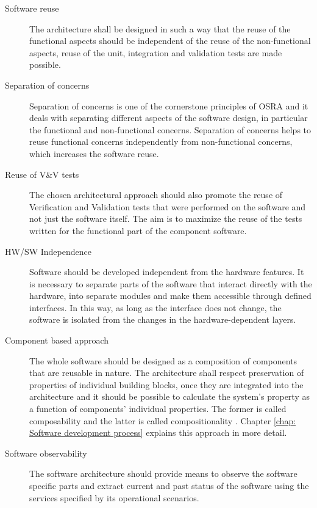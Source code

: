 \begin{description}
\item [Software reuse] The architecture shall be designed in such a way that the reuse of the functional aspects should be independent of the reuse of the non-functional aspects, reuse of the unit, integration and validation tests are made possible.
 
\item [Separation of concerns] Separation of concerns is one of the cornerstone principles of OSRA and it deals with separating different aspects of the software design, in particular the functional and non-functional concerns. Separation of concerns helps to reuse functional concerns independently from non-functional concerns, which increases the software reuse.
 
\item [Reuse of V\&V tests] The chosen architectural approach should also promote the reuse of Verification and Validation tests that were performed on the software and not just the software itself. The aim is to maximize the reuse of the tests written for the functional part of the component software.

\item [HW/SW Independence] Software should be developed independent from the hardware features. It is necessary to separate parts of the software that interact directly with the hardware, into separate modules and make them accessible through defined interfaces. In this way, as long as the interface does not change, the software is isolated from the changes in the hardware-dependent layers.
	  	
\item [Component based approach] The whole software should be designed as a composition of components that are reusable in nature. The architecture shall respect preservation of properties of individual building blocks, once they are integrated into the architecture and it should be possible to calculate the system's property as a function of components' individual properties. The former is called composability and the latter is called compositionality \cite{CompBasedDev}. Chapter \cref{chap: Software development process} explains this approach in more detail.
  
\item [Software observability] The software architecture should provide means to observe the software specific parts and extract current and past status of the software using the services specified by its operational scenarios.


\end{description}
